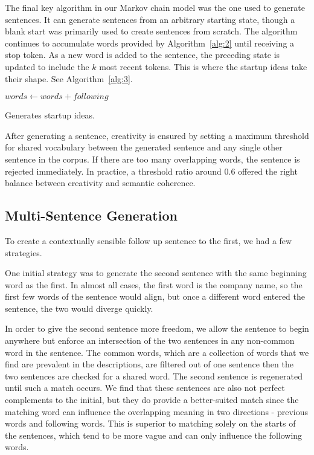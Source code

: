 \documentclass[11pt]{article}
\begin{document}
The final key algorithm in our Markov chain model was the one used to generate sentences. It can generate sentences from an arbitrary starting state, though a blank start was primarily used to create sentences from scratch. The algorithm continues to accumulate words provided by Algorithm~\ref{alg:2} until receiving a stop token. As a new word is added to the sentence, the preceding state is updated to include the \(k\) most recent tokens. This is where the startup ideas take their shape. See Algorithm~\ref{alg:3}.

\begin{algorithm}
  \begin{algorithmic}

        {$words \gets words + following$}
      \EndIf
    \EndWhile
    \EndProcedure{}
  \end{algorithmic}
  \caption{Generates startup ideas.}
  \label{alg:3}
\end{algorithm}

After generating a sentence, creativity is ensured by setting a maximum threshold for shared vocabulary between the generated sentence and any single other sentence in the corpus. If there are too many overlapping words, the sentence is rejected immediately. In practice, a threshold ratio around 0.6 offered the right balance between creativity and semantic coherence.

\subsection{Multi-Sentence Generation}
To create a contextually sensible follow up sentence to the first, we had a few strategies. 

One initial strategy was to generate the second sentence with the same beginning word as the first. In almost all cases, the first word is the company name, so the first few words of the sentence would align, but once a different word entered the sentence, the two would diverge quickly. 

In order to give the second sentence more freedom, we allow the sentence to begin anywhere but enforce an intersection of the two sentences in any non-common word in the sentence. The common words, which are a collection of words that we find are prevalent in the descriptions, are filtered out of one sentence then the two sentences are checked for a shared word. The second sentence is regenerated until such a match occurs. We find that these sentences are also not perfect complements to the initial, but they do provide a better-suited match since the matching word can influence the overlapping meaning in two directions - previous words and following words. This is superior to matching solely on the starts of the sentences, which tend to be more vague and can only influence the following words. 
\end{document}
